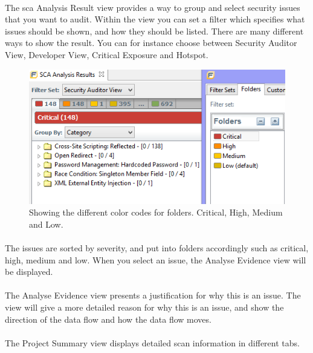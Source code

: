 \documentclass[11pt,english,a4paper]{report}
\begin{document}
\paragraph{}
The \gls{sca} Analysis Result view provides a way to group and select security issues that you want to audit. 
Within the view you can set a filter which specifies what issues should be shown, and how they should be listed.
There are many different ways to show the result.
You can for instance choose between Security Auditor View, Developer View, Critical Exposure and Hotspot.

\begin{figure}[h]
    \centering
    \includegraphics[scale=0.65]{images/fortifyfolders-sc.png}
    \caption{Showing the different color codes for folders. Critical, High, Medium and Low. }
    \label{fig:fortifyfoldersscreenshot}
\end{figure}

\paragraph{}
The issues are sorted by severity, and put into folders accordingly such as critical, high, medium and low. 
When you select an issue, the Analyse Evidence view will be displayed. \cite{installation-usage-guide}

\paragraph{}
\label{analyseevidence}
The Analyse Evidence view presents a justification for why this is an issue.
The view will give a more detailed reason for why this is an issue, and show the direction of the data flow and how the data flow moves. \cite{installation-usage-guide}

\paragraph{}
The Project Summary view displays detailed scan information in different tabs.
\end{document}
